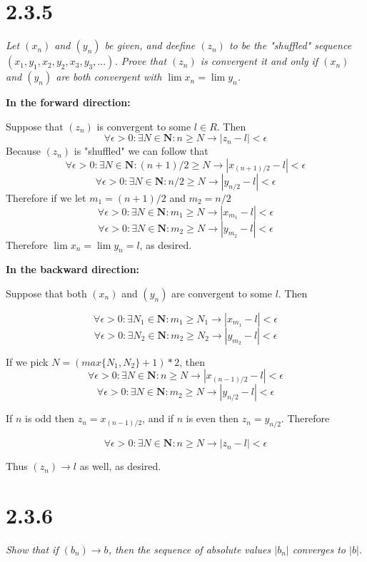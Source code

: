 \documentclass[11pt,oneside,titlepage]{book}
\begin{document}
\section*{2.3.5}
\textit{Let $(x_n)$ and $(y_n)$ be given, and deefine $(z_n)$ to be the
  "shuffled" sequence $(x_1, y_1, x_2, y_2, x_3, y_3, ...)$. Prove that
  $(z_n)$ is convergent it and only if $(x_n)$ and $(y_n)$ are both
  convergent with $\lim x_n = \lim y_n $.}

\textbf{In the forward direction:}

Suppose that $(z_n)$ is convergent to some $l \in R$. Then 
$$\forall \epsilon > 0: \exists N \in \textbf{N}: n \geq N \to |z_n - l| < \epsilon$$
Because $(z_n)$ is "shuffled" we can follow that 
$$\forall \epsilon > 0: \exists N \in \textbf{N}: (n + 1) / 2 \geq N \to
|x_{(n + 1) / 2} - l| < \epsilon$$
$$\forall \epsilon > 0: \exists N \in \textbf{N}: n  / 2 \geq N \to |y_{n/2} - l| < \epsilon$$
Therefore if we let $m_1 = (n + 1) / 2$ and $m_2 = n/2$
$$\forall \epsilon > 0: \exists N \in \textbf{N}: m_1 \geq N \to |x_{m_1} - l| < \epsilon$$
$$\forall \epsilon > 0: \exists N \in \textbf{N}: m_2 \geq N \to |y_{m_2} - l| < \epsilon$$
Therefore $\lim x_n = \lim y_n = l$, as desired.

\textbf{In the backward direction:}

Suppose that both $(x_n)$ and $(y_n)$ are convergent to some $l$. Then

$$\forall \epsilon > 0: \exists N_1 \in \textbf{N}: m_1 \geq N_1 \to |x_{m_1} - l| < \epsilon$$
$$\forall \epsilon > 0: \exists N_2 \in \textbf{N}: m_2 \geq N_2 \to |y_{m_2} - l| < \epsilon$$

If we pick $N = (max\{N_1, N_2\} + 1) * 2$, then
$$\forall \epsilon > 0: \exists N \in \textbf{N}: n \geq N \to |x_{(n - 1) / 2 } - l| < \epsilon$$
$$\forall \epsilon > 0: \exists N \in \textbf{N}: m_2 \geq N \to |y_{n/2} - l| < \epsilon$$

If $n$ is odd then  $z_n = x_{(n - 1) / 2}$, and if $n$ is even
then $z_n = y_{n/2}$. Therefore 

$$\forall \epsilon > 0: \exists N \in \textbf{N}: n \geq N \to |z_n - l| < \epsilon$$

Thus $(z_n) \to l$ as well, as desired.

\section*{2.3.6}
\textit{Show that if $(b_n) \to b$, then the sequence of absolute values
  $|b_n|$ converges to $|b|$.}
\end{document}
